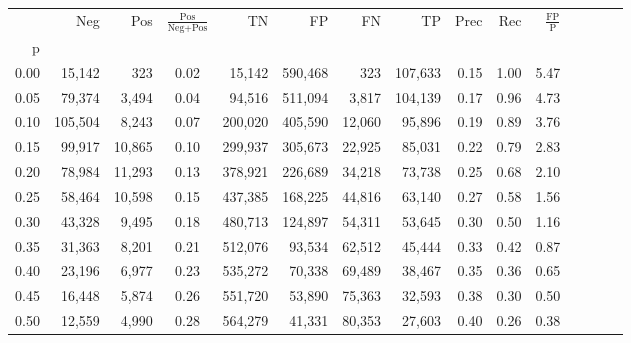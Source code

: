 \begin{tabular}{rrrcrrrrrrrrrrr}
\toprule
{} &      Neg &     Pos & $\frac{\text{Pos}}{\text{Neg}+\text{Pos}}$ &       TN &       FP &       FN &       TP &  Prec &   Rec & $\frac{\text{FP}}{\text{P}}$ \\
p    &          &         &                                            &          &          &          &          &       &       &                              \\
\midrule
0.00 &   15,142 &     323 &                                       0.02 &   15,142 &  590,468 &      323 &  107,633 &  0.15 &  1.00 &                         5.47 \\
0.05 &   79,374 &   3,494 &                                       0.04 &   94,516 &  511,094 &    3,817 &  104,139 &  0.17 &  0.96 &                         4.73 \\
0.10 &  105,504 &   8,243 &                                       0.07 &  200,020 &  405,590 &   12,060 &   95,896 &  0.19 &  0.89 &                         3.76 \\
0.15 &   99,917 &  10,865 &                                       0.10 &  299,937 &  305,673 &   22,925 &   85,031 &  0.22 &  0.79 &                         2.83 \\
0.20 &   78,984 &  11,293 &                                       0.13 &  378,921 &  226,689 &   34,218 &   73,738 &  0.25 &  0.68 &                         2.10 \\
0.25 &   58,464 &  10,598 &                                       0.15 &  437,385 &  168,225 &   44,816 &   63,140 &  0.27 &  0.58 &                         1.56 \\
0.30 &   43,328 &   9,495 &                                       0.18 &  480,713 &  124,897 &   54,311 &   53,645 &  0.30 &  0.50 &                         1.16 \\
0.35 &   31,363 &   8,201 &                                       0.21 &  512,076 &   93,534 &   62,512 &   45,444 &  0.33 &  0.42 &                         0.87 \\
0.40 &   23,196 &   6,977 &                                       0.23 &  535,272 &   70,338 &   69,489 &   38,467 &  0.35 &  0.36 &                         0.65 \\
0.45 &   16,448 &   5,874 &                                       0.26 &  551,720 &   53,890 &   75,363 &   32,593 &  0.38 &  0.30 &                         0.50 \\
0.50 &   12,559 &   4,990 &                                       0.28 &  564,279 &   41,331 &   80,353 &   27,603 &  0.40 &  0.26 &                         0.38 \\

\end{tabular}
